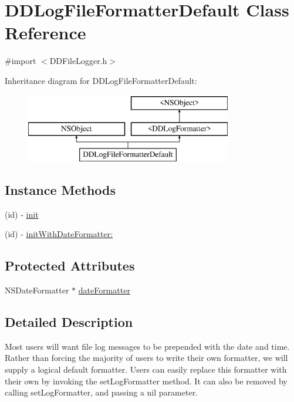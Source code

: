 \hypertarget{interface_d_d_log_file_formatter_default}{\section{D\-D\-Log\-File\-Formatter\-Default Class Reference}
\label{interface_d_d_log_file_formatter_default}
}


{\ttfamily \#import $<$D\-D\-File\-Logger.\-h$>$}

Inheritance diagram for D\-D\-Log\-File\-Formatter\-Default\-:\begin{figure}[H]
\begin{center}
\leavevmode
\includegraphics[height=3.000000cm]{interface_d_d_log_file_formatter_default}
\end{center}
\end{figure}
\subsection*{Instance Methods}
\begin{DoxyCompactItemize}
\item 
(id) -\/ \hyperlink{interface_d_d_log_file_formatter_default_a7c6499a3fe60c156eac7eef2ca8a4161}{init}
\item 
(id) -\/ \hyperlink{interface_d_d_log_file_formatter_default_ab0c50b53471b69fcb9fd18e0fedd6e03}{init\-With\-Date\-Formatter\-:}
\end{DoxyCompactItemize}
\subsection*{Protected Attributes}
\begin{DoxyCompactItemize}
\item 
N\-S\-Date\-Formatter $\ast$ \hyperlink{interface_d_d_log_file_formatter_default_a12d1a9a76e3f2b760ea82359664315ac}{date\-Formatter}
\end{DoxyCompactItemize}


\subsection{Detailed Description}
Most users will want file log messages to be prepended with the date and time. Rather than forcing the majority of users to write their own formatter, we will supply a logical default formatter. Users can easily replace this formatter with their own by invoking the set\-Log\-Formatter method. It can also be removed by calling set\-Log\-Formatter, and passing a nil parameter.

